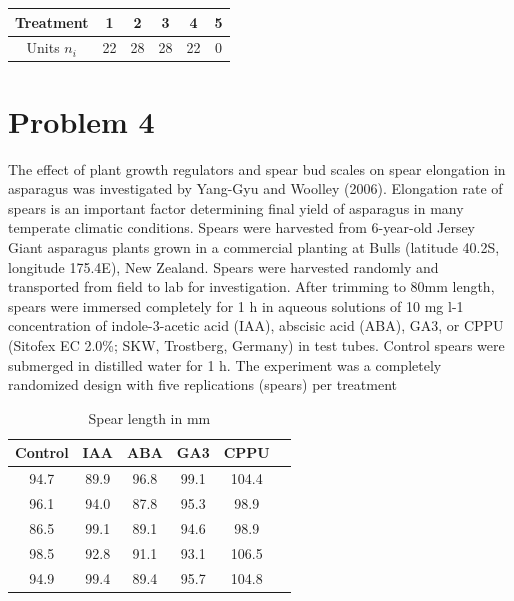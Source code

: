 \documentclass{article}
\begin{document}
\begin{table}[h]
	\centering
	\begin{tabular}{cccccc}
		\toprule
		Treatment   & 1  & 2  & 3  & 4  & 5 \\
		\midrule
		Units $n_i$ & 22 & 28 & 28 & 22 & 0 \\
		\bottomrule
	\end{tabular}
\end{table}


\section{Problem 4}

The effect of plant growth regulators and spear bud scales on spear elongation in asparagus
was investigated by Yang-Gyu and Woolley (2006). Elongation rate of spears is an important factor
determining final yield of asparagus in many temperate climatic conditions. Spears were harvested
from 6-year-old Jersey Giant asparagus plants grown in a commercial planting at Bulls (latitude 40.2S,
longitude 175.4E), New Zealand. Spears were harvested randomly and transported from field to lab
for investigation. After trimming to 80mm length, spears were immersed completely for 1 h in aqueous
solutions of 10 mg l-1 concentration of indole-3-acetic acid (IAA), abscisic acid (ABA), GA3, or CPPU
(Sitofex EC 2.0\%; SKW, Trostberg, Germany) in test tubes. Control spears were submerged in distilled
water for 1 h. The experiment was a completely randomized design with five replications (spears) per
treatment
\begin{table}[!ht]
	\centering
	\caption{Spear length in mm}
	\begin{tabular}{c c c c c c}
		\hline
		\textbf{Control} & \textbf{IAA} & \textbf{ABA} & \textbf{GA3} & \textbf{CPPU} \\
		\hline
		94.7             & 89.9         & 96.8         & 99.1         & 104.4         \\
		96.1             & 94.0         & 87.8         & 95.3         & 98.9          \\
		86.5             & 99.1         & 89.1         & 94.6         & 98.9          \\
		98.5             & 92.8         & 91.1         & 93.1         & 106.5         \\
		94.9             & 99.4         & 89.4         & 95.7         & 104.8         \\
		\hline
	\end{tabular}
\end{table}
\end{document}
